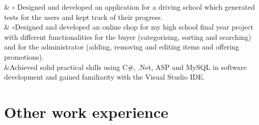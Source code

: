 \documentclass[11pt,a4paper]{article}
\begin{document}
\begin {longtabu}
& \hspace{1em}$\circ$\hspace{1.5em}
Designed and developed an application for a driving school which generated tests 
for the users and kept track of their progress.\vspace{5pt}\\

& \hspace{1em}$\circ$\hspace{1.5em}Designed and developed an online shop for my 
high school final year project with different functionalities for the buyer 
(categorising, sorting and searching) and for the administrator (adding, 
removing and editing items and offering promotions).\vspace{5pt}\\
&Achieved solid practical skills using C\#, .Net, ASP and MySQL in software 
development and gained familiarity with the Visual Studio IDE.\vspace{5pt}\\

\end{longtabu}

\vspace{1.3em}    %

\section*{Other work experience\vspace{-2ex}}
\end{document}
